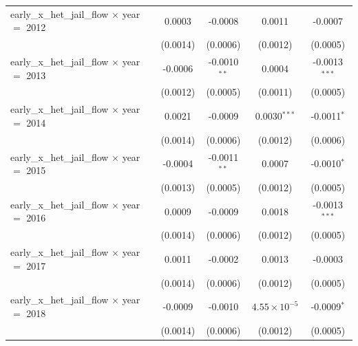 \begin{tabular}{lcccc}
   early\_x\_het\_jail\_flow $\times$ year $=$ 2012      & 0.0003                 & -0.0008                   & 0.0011                 & -0.0007\\   
                                                         & (0.0014)               & (0.0006)                  & (0.0012)               & (0.0005)\\   
   early\_x\_het\_jail\_flow $\times$ year $=$ 2013      & -0.0006                & -0.0010$^{**}$            & 0.0004                 & -0.0013$^{***}$\\   
                                                         & (0.0012)               & (0.0005)                  & (0.0011)               & (0.0005)\\   
   early\_x\_het\_jail\_flow $\times$ year $=$ 2014      & 0.0021                 & -0.0009                   & 0.0030$^{***}$         & -0.0011$^{*}$\\   
                                                         & (0.0014)               & (0.0006)                  & (0.0012)               & (0.0006)\\   
   early\_x\_het\_jail\_flow $\times$ year $=$ 2015      & -0.0004                & -0.0011$^{**}$            & 0.0007                 & -0.0010$^{*}$\\   
                                                         & (0.0013)               & (0.0005)                  & (0.0012)               & (0.0005)\\   
   early\_x\_het\_jail\_flow $\times$ year $=$ 2016      & 0.0009                 & -0.0009                   & 0.0018                 & -0.0013$^{***}$\\   
                                                         & (0.0014)               & (0.0006)                  & (0.0012)               & (0.0005)\\   
   early\_x\_het\_jail\_flow $\times$ year $=$ 2017      & 0.0011                 & -0.0002                   & 0.0013                 & -0.0003\\   
                                                         & (0.0014)               & (0.0006)                  & (0.0012)               & (0.0005)\\   
   early\_x\_het\_jail\_flow $\times$ year $=$ 2018      & -0.0009                & -0.0010                   & $4.55\times 10^{-5}$   & -0.0009$^{*}$\\   
                                                         & (0.0014)               & (0.0006)                  & (0.0012)               & (0.0005)\\   

\end{tabular}
